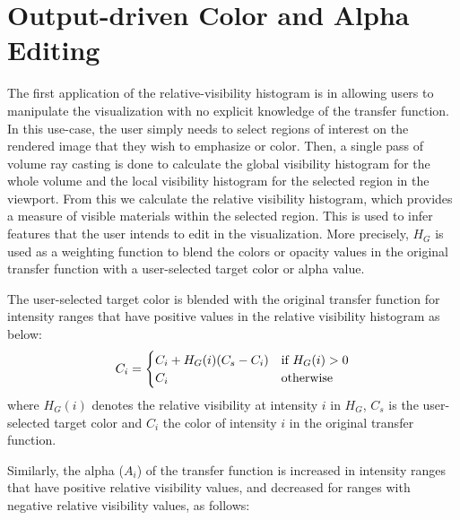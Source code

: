 \documentclass[twoside,twocolumn,10pt]{article}
\begin{document}
\section{Output-driven Color and Alpha Editing} \label{color_and_alpha_editing}

The first application of the relative-visibility histogram is in allowing users to manipulate the visualization with no explicit knowledge of the transfer function. In this use-case, the user simply needs to select regions of interest on the rendered image that they wish to emphasize or color.
Then, a single pass of volume ray casting is done to calculate the global visibility histogram for the whole volume and the local visibility histogram for the selected region in the viewport. From this we calculate the relative visibility histogram, which provides a measure of visible materials within the selected region. This is used to infer features that the user intends to edit in the visualization. More precisely, $H_G$ is used as a weighting function to blend the colors or opacity values in the original transfer function with a user-selected target color or alpha value.

The user-selected target color is blended with the original transfer function for intensity ranges that have positive values in the relative visibility histogram as below:
\[
C_{i} =
\begin{cases}
C_{i}+H_{G}(i)(C_{s}-C_{i}) & \text{if $ H_{G}(i)>0 $} \\
C_{i} & \text{otherwise}
\end{cases}
\]
where $ H_{G}(i) $ denotes the relative visibility at intensity $ i $ in $ H_{G} $, $ C_{s} $ is the user-selected target color and $ C_{i} $ the color of intensity $ i $ in the original transfer function.

Similarly, the alpha ($A_i$) of the transfer function is increased in intensity ranges that have positive relative visibility values, and decreased for ranges with negative relative visibility values, as follows:



\end{document}
